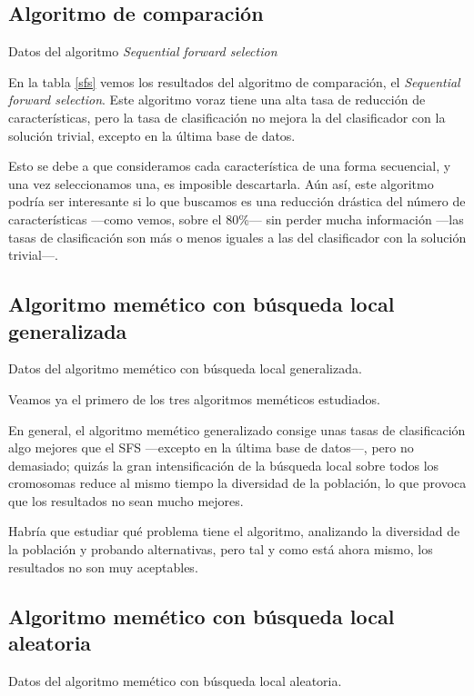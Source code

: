 \documentclass[a4paper, 11pt, titlepage]{article}
\begin{document}
    \subsection{Algoritmo de comparación}
    \begin{table}[!htb]
        \maketable{\dataSFS}
        \caption{Datos del algoritmo \emph{Sequential forward selection}}
        \label{sfs}
    \end{table}

    En la tabla \ref{sfs} vemos los resultados del algoritmo de comparación, el \emph{Sequential forward selection}. Este algoritmo voraz tiene una alta tasa de reducción de características, pero la tasa de clasificación no mejora la del clasificador con la solución trivial, excepto en la última base de datos.

    Esto se debe a que consideramos cada característica de una forma secuencial, y una vez seleccionamos una, es imposible descartarla. Aún así, este algoritmo podría ser interesante si lo que buscamos es una reducción drástica del número de características ---como vemos, sobre el 80\%--- sin perder mucha información ---las tasas de clasificación son más o menos iguales a las del clasificador con la solución trivial---.

    \subsection{Algoritmo memético con búsqueda local generalizada}
    \begin{table}[!htb]
        \maketable{\dataAMTT}
        \caption{Datos del algoritmo memético con búsqueda local generalizada.}
        \label{tablaAMTT}
    \end{table}

    Veamos ya el primero de los tres algoritmos meméticos estudiados.

    En general, el algoritmo memético generalizado consige unas tasas de clasificación algo mejores que el SFS ---excepto en la última base de datos---, pero no demasiado; quizás la gran intensificación de la búsqueda local sobre todos los cromosomas reduce al mismo tiempo la diversidad de la población, lo que provoca que los resultados no sean mucho mejores.

    Habría que estudiar qué problema tiene el algoritmo, analizando la diversidad de la población y probando alternativas, pero tal y como está ahora mismo, los resultados no son muy aceptables.

    \subsection{Algoritmo memético con búsqueda local aleatoria}
    \begin{table}[!htb]
        \maketable{\dataAMTZ}
        \caption{Datos del algoritmo memético con búsqueda local aleatoria.}
        \label{tablaAMTZ}
    \end{table}
\end{document}

